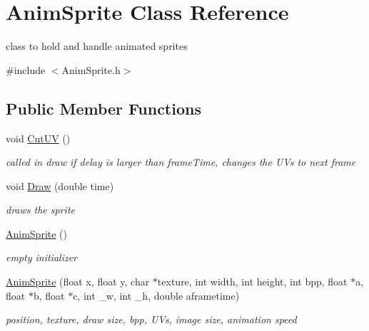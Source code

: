 \hypertarget{class_anim_sprite}{}\section{Anim\+Sprite Class Reference}
\label{class_anim_sprite}


class to hold and handle animated sprites  




{\ttfamily \#include $<$Anim\+Sprite.\+h$>$}

\subsection*{Public Member Functions}
\begin{DoxyCompactItemize}
\item 
\hypertarget{class_anim_sprite_a6119e99bd832419cfa6c4f546bb6c04f}{}void \hyperlink{class_anim_sprite_a6119e99bd832419cfa6c4f546bb6c04f}{Cut\+U\+V} ()\label{class_anim_sprite_a6119e99bd832419cfa6c4f546bb6c04f}

\begin{DoxyCompactList}\small\item\em called in draw if delay is larger than frame\+Time, changes the U\+Vs to next frame \end{DoxyCompactList}\item 
\hypertarget{class_anim_sprite_aeee40cbb96ced56a273e28c27748150a}{}void \hyperlink{class_anim_sprite_aeee40cbb96ced56a273e28c27748150a}{Draw} (double time)\label{class_anim_sprite_aeee40cbb96ced56a273e28c27748150a}

\begin{DoxyCompactList}\small\item\em draw\textquotesingle{}s the sprite \end{DoxyCompactList}\item 
\hypertarget{class_anim_sprite_a2d26ca05460aabc03e6d7552f7efceed}{}\hyperlink{class_anim_sprite_a2d26ca05460aabc03e6d7552f7efceed}{Anim\+Sprite} ()\label{class_anim_sprite_a2d26ca05460aabc03e6d7552f7efceed}

\begin{DoxyCompactList}\small\item\em empty initializer \end{DoxyCompactList}\item 
\hypertarget{class_anim_sprite_a5246c030c7b649b8690c020f2b7ec835}{}\hyperlink{class_anim_sprite_a5246c030c7b649b8690c020f2b7ec835}{Anim\+Sprite} (float x, float y, char $\ast$texture, int width, int height, int bpp, float $\ast$a, float $\ast$b, float $\ast$c, int \+\_\+w, int \+\_\+h, double aframetime)\label{class_anim_sprite_a5246c030c7b649b8690c020f2b7ec835}

\begin{DoxyCompactList}\small\item\em position, texture, draw size, bpp, U\+Vs, image size, animation speed \end{DoxyCompactList}\end{DoxyCompactItemize}

